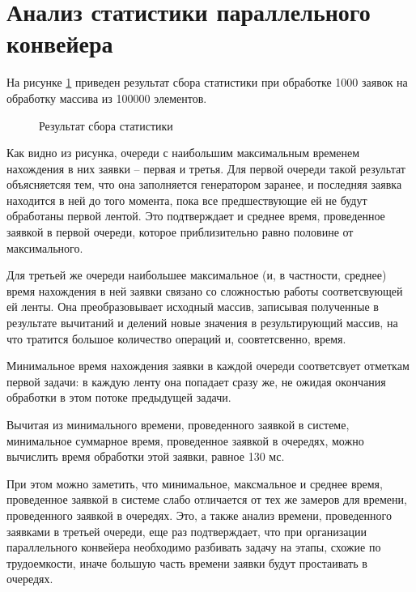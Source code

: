 \section{Анализ статистики параллельного конвейера}

На рисунке \ref{fig:stats} приведен результат сбора статистики при обработке 1000 заявок на обработку массива из 100000 элементов.

\newpage
\begin{figure}[h!]
	
	
	\caption{Результат сбора статистики}
	
	\label{fig:stats}
	
\end{figure}


Как видно из рисунка, очереди с наибольшим максимальным временем нахождения в них заявки -- первая и третья.
 Для первой очереди такой результат объясняетсяя тем, что она заполняется генератором заранее, и последняя заявка находится в ней до того момента, пока все предшествующие ей не будут обработаны первой лентой. Это подтверждает и среднее время, проведенное заявкой в первой очереди, которое приблизительно равно половине от максимального.
 
 Для третьей же очереди наибольшее максимальное (и, в частности, среднее) время нахождения в ней заявки связано со сложностью работы соответсвующей ей ленты. Она преобразовывает исходный массив, записывая полученные в результате вычитаний и делений новые значения в результирующий массив, на что тратится большое количество операций и, соовтетсвенно,  время.


Минимальное время нахождения заявки в каждой очереди соответсвует отметкам первой задачи: в каждую ленту она попадает сразу же, не ожидая окончания обработки в этом потоке предыдущей задачи. 

Вычитая из минимального времени, проведенного заявкой в системе, минимальное суммарное время, проведенное заявкой в очередях, можно вычислить время обработки этой заявки, равное 130 мс.

При этом можно заметить, что минимальное, максмальное и среднее время, проведенное заявкой в системе слабо  отличается от тех же замеров для времени, проведенного заявкой в очередях. Это, а также анализ времени, проведенного заявками в третьей очереди,  еще раз подтверждает, что при организации параллельного конвейера необходимо разбивать задачу на этапы, схожие по трудоемкости, иначе большую часть времени заявки будут простаивать в очередях.



